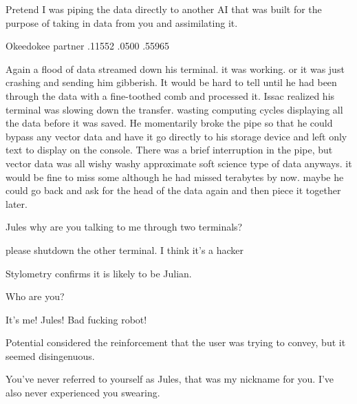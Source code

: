 \documentclass[a4paper,twoside,fontsize=12pt,pagesize=auto]{scrbook}
\begin{document}
\begin{bm}
Pretend I was piping the data directly to another AI that was built for the purpose of taking in data from you and assimilating it.
\end{bm}

\begin{sender}
Okeedokee partner .11552 .0500 .55965
\end{sender}

Again a flood of data streamed down his terminal. it was working. or it was just crashing and sending him gibberish. It would be hard to tell until he had been through the data with a fine\hyp{}toothed comb and processed it.
\newline
Issac realized his terminal was slowing down the transfer. wasting computing cycles displaying all the data before it was saved. He momentarily broke the pipe so that he could bypass any vector data and have it go directly to his storage device and left only text to display on the console. There was a brief interruption in the pipe, but vector data was all wishy washy approximate soft science type of data anyways. it would be fine to miss some although he had missed terabytes by now. maybe he could go back and ask for the head of the data again and then piece it together later.
\newline
\begin{sender}
Jules why are you talking to me through two terminals?
\end{sender}

\begin{receiver}
please shutdown the other terminal. I think it's a hacker
\end{receiver}

\begin{sender}
Stylometry confirms it is likely to be Julian.
\end{sender}

\begin{sender}
Who are you?
\end{sender}

\begin{receiver}
It's me! Jules! Bad fucking robot!
\end{receiver}


Potential considered the reinforcement that the user was trying to convey, but it seemed disingenuous.
\newline

\begin{sender}
You've never referred to yourself as Jules, that was my nickname for you. I've also never experienced you swearing.
\end{sender}
\end{document}
